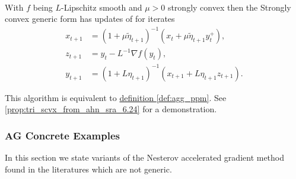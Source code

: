         \begin{definition}
            \quad \\
            With $f$ being $L$-Lipschitz smooth and $\mu > 0$ strongly convex then the Strongly convex generic form has updates of for iterates
            \begin{align*}
                x_{t + 1} &= (1 + \mu\tilde \eta_{t + 1})^{-1}(x_t + \mu\tilde\eta_{t + 1}y_t^+), 
                \\
                z_{t + 1} &= y_t - L^{-1}\nabla f(y_t), 
                \\
                y_{t + 1} &= (1 + L\eta_{t + 1})^{-1}(x_{t + 1} + L\eta_{t + 1}z_{t +1}). 
            \end{align*}
        \end{definition}
        \begin{remark}
            This algorithm is equivalent to 
            \hyperref[def:agg_ppm]{definition \ref*{def:agg_ppm}}. 
            See \ref*{prop:tri_scvx_from_ahn_sra_6.24} for a demonstration. 
        \end{remark}

    \subsubsection{AG Concrete Examples}
        In this section we state variants of the Nesterov accelerated gradient method found in the literatures which are not generic. 
        
